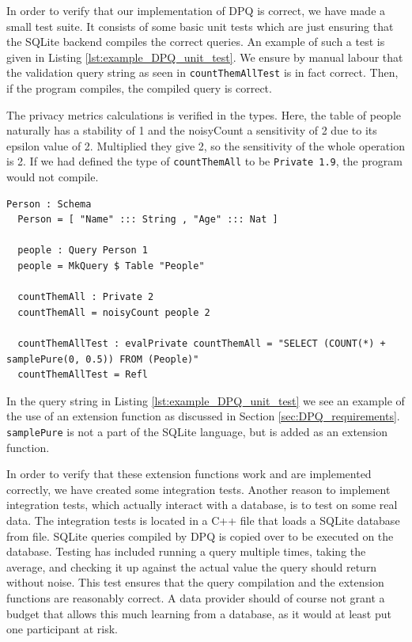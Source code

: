 \documentclass[12pt]{report}
\begin{document}
In order to verify that our implementation of DPQ is correct, we have made a small test suite.
It consists of some basic unit tests which are just ensuring that the SQLite backend compiles the correct queries.
An example of such a test is given in Listing \ref{lst:example_DPQ_unit_test}.
We ensure by manual labour that the validation query string as seen in \texttt{countThemAllTest} is in fact correct.
Then, if the program compiles, the compiled query is correct.

The privacy metrics calculations is verified in the types.
Here, the table of people naturally has a stability of 1 and the noisyCount a sensitivity of 2 due to its epsilon value of 2.
Multiplied they give 2, so the sensitivity of the whole operation is 2.
If we had defined the type of \texttt{countThemAll} to be \texttt{Private 1.9}, the program would not compile.

\begin{lstlisting}[float,caption={Unit test for noisyCount},label={lst:example_DPQ_unit_test}]
  Person : Schema
  Person = [ "Name" ::: String , "Age" ::: Nat ]

  people : Query Person 1
  people = MkQuery $ Table "People"

  countThemAll : Private 2
  countThemAll = noisyCount people 2

  countThemAllTest : evalPrivate countThemAll = "SELECT (COUNT(*) + samplePure(0, 0.5)) FROM (People)"
  countThemAllTest = Refl

\end{lstlisting}

In the query string in Listing \ref{lst:example_DPQ_unit_test} we see an example of the use of an extension function as discussed in Section \ref{sec:DPQ_requirements}.
\texttt{samplePure} is not a part of the SQLite language, but is added as an extension function.

In order to verify that these extension functions work and are implemented correctly, we have created some integration tests.
Another reason to implement integration tests, which actually interact with a database, is to test on some real data.
The integration tests is located in a C++ file that loads a SQLite database from file.
SQLite queries compiled by DPQ is copied over to be executed on the database.
Testing has included running a query multiple times, taking the average, and checking it up against the actual value the query should return without noise.
This test ensures that the query compilation and the extension functions are reasonably correct.
A data provider should of course not grant a budget that allows this much learning from a database, as it would at least put one participant at risk.
\end{document}
